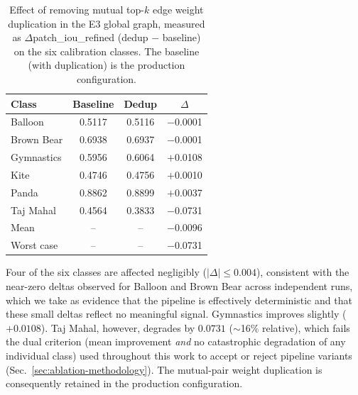 \begin{table}[t]
\centering
\caption{Effect of removing mutual top-$k$ edge weight duplication in the E3 global graph, measured as $\Delta$patch\_iou\_refined (dedup $-$ baseline) on the six calibration classes. The baseline (with duplication) is the production configuration.}
\label{tab:e3-graph-dedup}
\begin{tabular}{lccc}
\toprule
Class & Baseline & Dedup & $\Delta$ \\
\midrule
Balloon    & 0.5117 & 0.5116 & $-$0.0001 \\
Brown Bear & 0.6938 & 0.6937 & $-$0.0001 \\
Gymnastics & 0.5956 & 0.6064 & $+$0.0108 \\
Kite       & 0.4746 & 0.4756 & $+$0.0010 \\
Panda      & 0.8862 & 0.8899 & $+$0.0037 \\
Taj Mahal  & 0.4564 & 0.3833 & $-$0.0731 \\
\midrule
Mean       & --     & --     & $-$0.0096 \\
Worst case & --     & --     & $-$0.0731 \\
\bottomrule
\end{tabular}
\end{table}

Four of the six classes are affected negligibly ($|\Delta| \le 0.004$), consistent with the near-zero deltas observed for Balloon and Brown Bear across independent runs, which we take as evidence that the pipeline is effectively deterministic and that these small deltas reflect no meaningful signal. Gymnastics improves slightly ($+0.0108$). Taj Mahal, however, degrades by $0.0731$ ($\sim$16\% relative), which fails the dual criterion (mean improvement \emph{and} no catastrophic degradation of any individual class) used throughout this work to accept or reject pipeline variants (Sec.~\ref{sec:ablation-methodology}). The mutual-pair weight duplication is consequently retained in the production configuration.

